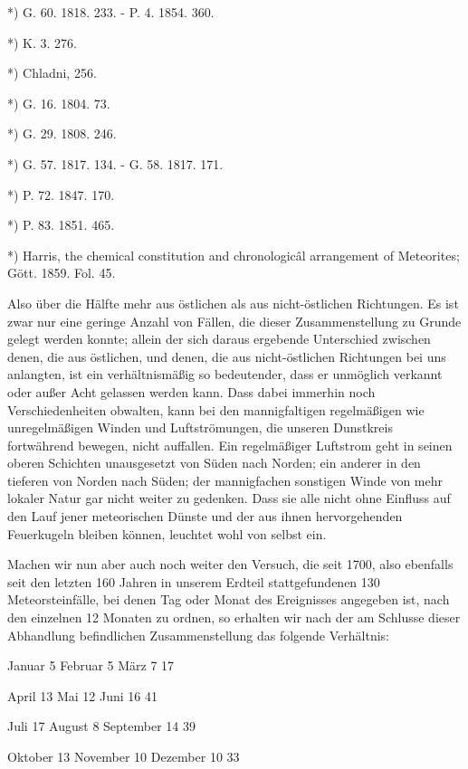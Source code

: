 \documentclass[a4paper, 11pt, oneside, polutonikogreek, german]{article}
\begin{document}
*) G. 60. 1818. 233. - P. 4. 1854. 360.

*) K. 3. 276.

*) Chladni, 256.

*) G. 16. 1804. 73.

*) G. 29. 1808. 246.

*) G. 57. 1817. 134. - G. 58. 1817. 171.

*) P. 72. 1847. 170.

*) P. 83. 1851. 465.

*) Harris, the chemical constitution and chronologicâl arrangement of Meteorites; Gött. 1859. Fol. 45.

Also über die Hälfte mehr aus östlichen als aus nicht-östlichen Richtungen. Es ist zwar nur eine geringe Anzahl von Fällen, die dieser Zusammenstellung zu Grunde gelegt werden konnte; allein der sich daraus ergebende Unterschied zwischen denen, die aus östlichen, und denen, die aus nicht-östlichen Richtungen bei uns anlangten, ist ein verhältnismäßig so bedeutender, dass er unmöglich verkannt oder außer Acht gelassen werden kann. Dass dabei immerhin noch Verschiedenheiten obwalten, kann bei den mannigfaltigen regelmäßigen wie unregelmäßigen Winden und Luftströmungen, die unseren Dunstkreis fortwährend bewegen, nicht auffallen. Ein regelmäßiger Luftstrom geht in seinen oberen Schichten unausgesetzt von Süden nach Norden; ein anderer in den tieferen von Norden nach Süden; der mannigfachen sonstigen Winde von mehr lokaler Natur gar nicht weiter zu gedenken. Dass sie alle nicht ohne Einfluss auf den Lauf jener meteorischen Dünste und der aus ihnen hervorgehenden Feuerkugeln bleiben können, leuchtet wohl von selbst ein.

Machen wir nun aber auch noch weiter den Versuch, die seit 1700, also ebenfalls seit den letzten 160 Jahren in unserem Erdteil stattgefundenen 130 Meteorsteinfälle, bei denen Tag oder Monat des Ereignisses angegeben ist, nach den einzelnen 12 Monaten zu ordnen, so erhalten wir nach der am Schlusse dieser Abhandlung befindlichen Zusammenstellung das folgende Verhältnis:

Januar 5  
Februar 5  
März 7  
17  

April 13  
Mai 12  
Juni 16  
41

Juli 17  
August 8  
September 14  
39

Oktober 13  
November 10  
Dezember 10  
33
\end{document}
